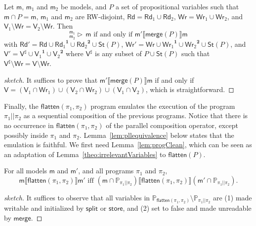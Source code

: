 \documentclass{llncs}
\newcommand{\progStore}{\mathsf{store}}
\newcommand{\progsplit}{\mathsf{split}}
\newcommand{\progmerge}{\mathsf{merge}}
\newcommand{\progFlatten}{\mathsf{flatten}}
\newcommand{\cp}[2]{{#2}^\mathbf{#1}}
\newcommand{\modl}{\mathsf m}
\newcommand{\mrg}[3]{ ^{#2}_{#3} \triangleright \, #1 }
\newcommand{\pll}{ {||} }							%
\newcommand{\readset}{\mathsf{Rd}}
\newcommand{\valuset}{\mathsf{V}}
\newcommand{\writeset}{\mathsf{Wr}}
\newcommand{\storeset}{\mathsf{St}}
\newcommand{\intPgm}[1]{\llbracket #1 \rrbracket}
\newcommand{\propset}{\mathbb P}
\newcommand{\propsetOf}[1]{\propset_{#1}}
\newcommand{\modinter}{\cap}
\begin{document}
\begin{lemma}\label{lem:progmerge}
Let $\modl$, $\modl_1$ and $\modl_2$ be models, and $P$ a set of propositional variables
such that $\modl \modinter P = \modl$,
        $\modl_1$ and $\modl_2$ are RW-disjoint,
        $\readset = \readset_1 \cup \readset_2$,
        $\writeset = \writeset_1 \cup \writeset_2$, and
        $\valuset_1 \setminus \writeset = \valuset_2 \setminus \writeset$.
Then
$$\mrg \modl {\modl_1} {\modl_2} \text{ if and only if }
\modl' \intPgm{\progmerge(P)} \modl$$ with
$\readset' = \readset \cup \cp 1 {\readset_1} \cup \cp 2 {\readset_2} \cup \storeset(P)$,
$\writeset' = \writeset \cup \cp 1 {\writeset_1} \cup \cp 2 {\writeset_2} \cup \storeset(P)$, and
$\valuset' = \valuset^\sharp \cup \cp 1 {\valuset_1} \cup \cp 2 {\valuset_2}$
where $\valuset^\sharp$ is any subset of $P \cup \storeset(P)$ such that
$\valuset^\sharp \setminus \writeset = \valuset \setminus \writeset$.
\end{lemma}
\begin{proof}[sketch]
It suffices to prove that
$\modl' \intPgm{\progmerge(P)} \modl$ if and only if
$\valuset = (\valuset_1 \cap \writeset_1) \cup (\valuset_2 \cap \writeset_2) \cup (\valuset_1 \cap \valuset_2) $,
which is straightforward.
\end{proof}

Finally, the $\progFlatten(\pi_1, \pi_2)$ program emulates the execution of the program $\pi_1 \pll \pi_2$ as
a sequential composition of the previous programs.
Notice that there is no occurrence in $\progFlatten(\pi_1, \pi_2)$ of the parallel composition operator,
except possibly inside $\pi_1$ and $\pi_2$.
Lemma~\ref{lem:pllequivalence} below states that the emulation is faithful.
We first need Lemma~\ref{lem:progClean},
which can be seen as an adaptation of Lemma~\ref{theo:irrelevantVariables} to $\progFlatten(P)$.

\begin{lemma}\label{lem:progClean}
For all models $\modl$ and $\modl'$, and all programs $\pi_1$ and $\pi_2$,
$$
\modl \intPgm{\progFlatten(\pi_1,\pi_2)} \modl' \text{ iff }
(\modl \modinter \propsetOf{\pi_1 \pll \pi_2}) \intPgm{\progFlatten(\pi_1, \pi_2)} (\modl' \modinter \propsetOf{\pi_1 \pll \pi_2}).
$$
\end{lemma}
\begin{proof}[sketch]
It suffices to observe that all variables in $\propsetOf{\progFlatten(\pi_1, \pi_2)} \setminus \propsetOf{\pi_1 \pll \pi_2}$ are 
(1) made writable and initialized by $\progsplit$ or $\progStore$, and 
(2) set to false and made unreadable by $\progmerge$.
\end{proof}
\end{document}
